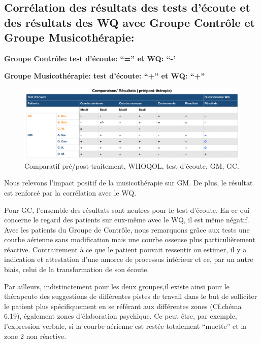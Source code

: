   \subsection{Corrélation des résultats des tests d'écoute et des
    résultats des WQ avec Groupe Contrôle et
    Groupe Musicothérapie:}
\textbf{Groupe Contrôle:} 	          \textbf{ test d'écoute: ``=''   et    WQ: ``-'}

 
\textbf{Groupe Musicothérapie:}     \textbf{test d'écoute: ``+''      et    WQ: ``+''}


 \begin{figure}[th]
\centering
\includegraphics[width=1\linewidth]{images/graphiques/comparaison_pre_post.png}
\caption[Corrélation résultats pré/post]{Comparatif
  pré/post-traitement, WHOQOL, test d'écoute, GM, GC.}
       
\label{comparaison_pre_post}
\end{figure}



                Nous relevons l'impact positif de la
                musicothérapie sur GM.
                De plus, le résultat est renforcé par la corrélation
                avec le WQ.

                
                Pour GC, l'ensemble des résultats sont neutres pour le
                test d'écoute. En ce qui concerne le
                regard des patients sur eux-même avec le WQ, il est
                même négatif. Avec les patients du Groupe de
              Contrôle, nous remarquons grâce aux tests une courbe aérienne
              sans modification mais une courbe osseuse plus
              particulièrement réactive. Contrairement à
              ce que le patient pouvait ressentir ou estimer, il y a indication  et attestation d'une amorce de
              processus intérieur et ce, par un autre biais, celui de
              la transformation de son 
              écoute.
              
 Par ailleurs, indistinctement pour les deux
 groupes,il existe ainsi pour le thérapeute des
 suggestions de différentes pistes de travail dans le but de 
 solliciter le patient plus spécifiquement en se référant aux
              différentes zones (Cf.chéma 6.19), également zones
 d'élaboration psychique. Ce peut être, par exemple,
              l'expression verbale, si la courbe aérienne est restée
              totalement ``muette'' et la zone 2 non
              réactive.

